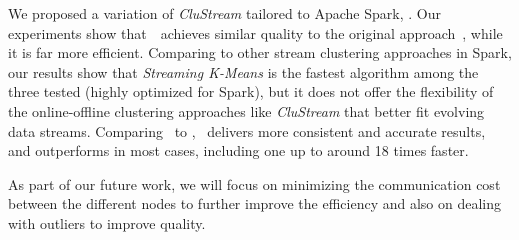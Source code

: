 We proposed a variation of \emph{CluStream} tailored to Apache Spark, \our.
Our experiments show that~\our~achieves similar quality to the original approach~\cite{clustreamOrig}, while it is far more efficient.
Comparing to other stream clustering approaches in Spark, our results show that \textit{Streaming K-Means} is the fastest algorithm among the three tested (highly optimized for Spark), but it does not offer the flexibility of the online-offline clustering approaches like \textit{CluStream} that better fit evolving data streams. 
Comparing \our~to \huawei, \our~delivers more consistent and accurate results, and outperforms \huawei in most cases, including one up to around 18 times faster. 

As part of our future work, we will focus on minimizing the communication cost between the different nodes to further improve the efficiency and also on dealing with outliers to improve quality.






